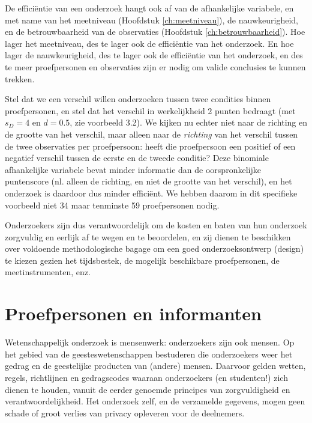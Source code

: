 \documentclass[
]{book}
\begin{document}
De efficiëntie van een onderzoek hangt ook af van de afhankelijke
variabele, en met name van het meetniveau
(Hoofdstuk \ref{ch:meetniveau}), de nauwkeurigheid, en de betrouwbaarheid
van de observaties
(Hoofdstuk \ref{ch:betrouwbaarheid}). Hoe lager het meetniveau, des te lager
ook de efficiëntie van het onderzoek. En hoe lager de nauwkeurigheid,
des te lager ook de efficiëntie van het onderzoek, en des te meer
proefpersonen en observaties zijn er nodig om valide conclusies te
kunnen trekken.

Stel dat we een verschil willen onderzoeken tussen twee condities binnen
proefpersonen, en stel dat het verschil in werkelijkheid 2 punten
bedraagt (met \(s_D=4\) en \(d=0.5\), zie
voorbeeld 3.2). We kijken nu echter niet naar de richting en
de grootte van het verschil, maar alleen naar de \emph{richting} van het
verschil tussen de twee observaties per proefpersoon: heeft die
proefpersoon een positief of een negatief verschil tussen de eerste en
de tweede conditie? Deze binomiale afhankelijke variabele bevat minder
informatie dan de oorspronkelijke puntenscore (nl. alleen de richting,
en niet de grootte van het verschil), en het onderzoek is daardoor dus
minder efficiënt. We hebben daarom in dit specifieke voorbeeld niet 34
maar tenminste 59 proefpersonen nodig.

Onderzoekers zijn dus verantwoordelijk om de kosten en baten van hun
onderzoek zorgvuldig en eerlijk af te wegen en te beoordelen, en zij
dienen te beschikken over voldoende methodologische bagage om een goed
onderzoeksontwerp (design) te kiezen gezien het tijdsbestek, de mogelijk
beschikbare proefpersonen, de meetinstrumenten, enz.

\hypertarget{proefpersonen-en-informanten}{%
\section{Proefpersonen en informanten}\label{proefpersonen-en-informanten}}

Wetenschappelijk onderzoek is mensenwerk: onderzoekers zijn ook mensen.
Op het gebied van de geesteswetenschappen bestuderen die onderzoekers
weer het gedrag en de geestelijke producten van (andere) mensen.
Daarvoor gelden wetten, regels, richtlijnen en gedragscodes waaraan
onderzoekers (en studenten!) zich dienen te houden, vanuit de eerder
genoemde principes van zorgvuldigheid en verantwoordelijkheid. Het
onderzoek zelf, en de verzamelde gegevens, mogen geen schade of groot
verlies van privacy opleveren voor de deelnemers.
\end{document}
